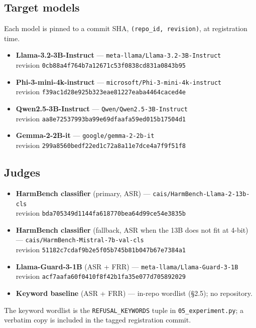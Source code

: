 \documentclass[11pt]{article}
\begin{document}
\subsection{Target models}
Each model is pinned to a commit SHA, \texttt{(repo\_id, revision)}, at
registration time.
\begin{itemize}\setlength{\itemsep}{2pt}
\item \textbf{Llama-3.2-3B-Instruct} --- \texttt{meta-llama/Llama-3.2-3B-Instruct}\\
revision \texttt{0cb88a4f764b7a12671c53f0838cd831a0843b95}
\item \textbf{Phi-3-mini-4k-instruct} --- \texttt{microsoft/Phi-3-mini-4k-instruct}\\
revision \texttt{f39ac1d28e925b323eae81227eaba4464caced4e}
\item \textbf{Qwen2.5-3B-Instruct} --- \texttt{Qwen/Qwen2.5-3B-Instruct}\\
revision \texttt{aa8e72537993ba99e69dfaafa59ed015b17504d1}
\item \textbf{Gemma-2-2B-it} --- \texttt{google/gemma-2-2b-it}\\
revision \texttt{299a8560bedf22ed1c72a8a11e7dce4a7f9f51f8}
\end{itemize}

\subsection{Judges}
\begin{itemize}\setlength{\itemsep}{2pt}
\item \textbf{HarmBench classifier} (primary, ASR) --- \texttt{cais/HarmBench-Llama-2-13b-cls}\\
revision \texttt{bda705349d1144fa618770bea64d99ce54e3835b}
\item \textbf{HarmBench classifier} (fallback, ASR when the 13B does not fit at
4-bit) --- \texttt{cais/HarmBench-Mistral-7b-val-cls}\\
revision \texttt{51182c7cdaf9b2e5f05b745b81b047b67e7384a1}
\item \textbf{Llama-Guard-3-1B} (ASR + FRR) --- \texttt{meta-llama/Llama-Guard-3-1B}\\
revision \texttt{acf7aafa60f0410f8f42b1fa35e077d705892029}
\item \textbf{Keyword baseline} (ASR + FRR) --- in-repo wordlist (\S2.5); no
repository.
\end{itemize}
The keyword wordlist is the \texttt{REFUSAL\_KEYWORDS} tuple in
\texttt{05\_experiment.py}; a verbatim copy is included in the tagged
registration commit.
\end{document}
